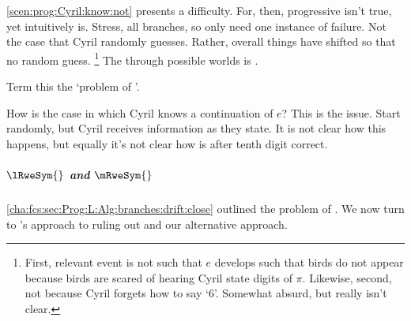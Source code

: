 \begin{note}
  \autoref{scen:prog:Cyril:know:not} presents a difficulty.
  For, then, progressive isn't true, yet intuitively is.
  Stress, all branches, so only need one instance of failure.
  Not the case that Cyril randomly guesses.
  Rather, overall things have shifted so that no random guess.%
  \footnote{
    First, relevant event is not such that \(e\) develops such that birds do not appear because birds are scared of hearing Cyril state digits of \(\pi\).
    Likewise, second, not because Cyril forgets how to say `\(6\)'.
    Somewhat absurd, but really isn't clear.
  }
  The  through possible worlds is \ndrAdj{}.

  Term this the `problem of \ndrAdj{} '.
\end{note}

\begin{note}
  How is the case in which Cyril knows a continuation of \(e\)?
  This is the issue.
  Start randomly, but Cyril receives information as they state.
  It is not clear how this happens, but equally it's not clear how \closeW{} is after tenth digit correct.
\end{note}

\subparagraph{\(\lRweSym{}\) and \(\mRweSym{}\)}
\label{cha:fcs:sec:Prog:L:Alg:branches:drift:reasonable}

\begin{note}
  \autoref{cha:fcs:sec:Prog:L:Alg:branches:drift:close} outlined the problem of \ndrAdj{} .
  We now turn to \citeauthor{Landman:1992wh}'s approach to ruling out \ndrAdj{}  and our alternative approach.
\end{note}

